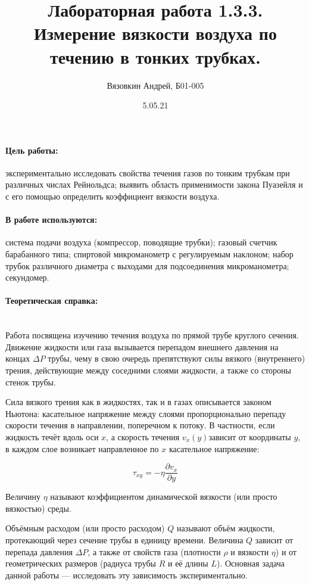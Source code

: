 \documentclass[a4paper, 12pt]{article}
\author{Вязовкин Андрей, Б01-005} %
\date{5.05.21}
\title{Лабораторная работа 1.3.3. Измерение вязкости воздуха по течению в тонких трубках.}
\newcommand{\parag}[1]{\paragraph*{#1:}}
\begin{document}
\maketitle

\parag {Цель работы} экспериментально исследовать свойства течения газов по тонким трубкам при различных числах Рейнольдса; выявить область применимости закона Пуазейля и с его помощью определить коэффициент вязкости воздуха.

\parag {В работе используются} система подачи воздуха (компрессор, поводящие трубки); газовый счетчик барабанного типа; спиртовой микроманометр с регулируемым наклоном; набор трубок различного диаметра с выходами для подсоединения микроманометра; секундомер.

\parag {Теоретическая справка} ~\\

Работа посвящена изучению течения воздуха по прямой трубе круглого сечения. Движение жидкости или газа вызывается перепадом внешнего давления на концах $\Delta P$ трубы, чему в свою очередь препятствуют силы вязкого (внутреннего) трения, действующие между соседними слоями жидкости, а также со стороны стенок трубы.

Сила вязкого трения как в жидкостях, так и в газах описывается законом Ньютона: касательное напряжение между слоями пропорционально перепаду скорости течения в направлении, поперечном к потоку. В частности, если жидкость течёт вдоль оси $x$,  а скорость течения $v_x(y)$зависит от координаты $y$, в каждом слое возникает направленное по $x$ касательное напряжение:

\[
    \tau_{xy} = - \eta \frac{\partial v_x}{\partial y}
\]

Величину $\eta$ называют коэффициентом динамической вязкости (или просто вязкостью) среды.

Объёмным расходом (или просто расходом) $Q$ называют объём жидкости,
протекающий через сечение трубы в единицу времени. Величина $Q$ зависит от
перепада давления $\Delta P$, а также от свойств газа (плотности $\rho$ и вязкости $\eta$) и от геометрических размеров (радиуса трубы $R$ и её длины $L$). Основная задача данной работы — исследовать эту зависимость экспериментально.

\end{document}
